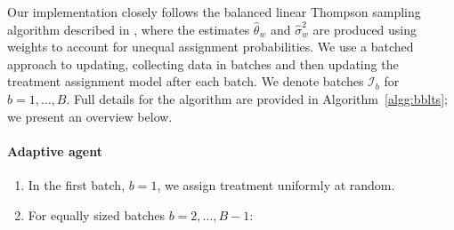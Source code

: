 \documentclass[letterpaper, 12pt, parskip=full,]{scrartcl}
\begin{document}
Our implementation closely follows the balanced linear Thompson sampling algorithm described in \cite{dimakopoulou2017estimation, dimakopoulou2019balanced}, where the estimates $\hat\theta_w$ and $\hat\sigma^2_w$ are produced using weights to account for unequal assignment probabilities. We use a batched approach to updating, collecting data in batches and then updating the treatment assignment model after each batch. We denote batches $\mathcal{I}_b$ for $b = 1, \dots, B$. Full details for the algorithm are provided in Algorithm~\ref{algg:bblts}; we present an overview below. 

\paragraph{Adaptive agent}

\begin{enumerate}
\item In the first batch, $b = 1$, we assign treatment uniformly at random. 

\item For equally sized batches $b = 2, \dots, B-1$:


\end{enumerate}
\end{document}
